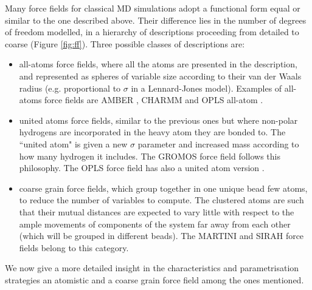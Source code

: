 \documentclass[graybox]{svmult}
\begin{document}
Many force fields for classical MD simulations adopt a functional form equal or similar to the one described above. Their difference lies in the number of degrees of freedom modelled, in a hierarchy of descriptions proceeding from detailed to coarse  (Figure \ref{fig:ff}). Three possible classes of descriptions are:
\begin{itemize}
\item all-atoms force fields, where all the atoms are presented in the description, and represented as spheres of variable size according to their van der Waals radius (e.g. proportional to $\sigma$ in a Lennard-Jones model). Examples of all-atoms force fields are AMBER \cite{Maier2015,Dickson2014,Wang2004_amber}, CHARMM \cite{MacKerell1998,Klauda2010,Huang2013} and OPLS all-atom \cite{Jorgensen1988}.
\item united atoms force fields, similar to the previous ones but where non-polar hydrogens are incorporated in the heavy atom they are bonded to. The ``united atom" is given a new $\sigma$ parameter and increased mass according to how many hydrogen it includes. The GROMOS force field \cite{Oostenbrink2004,Schmid2011} follows this philosophy. The OPLS force field has also a united atom version \cite{Jorgensen1996}.
\item coarse grain force fields, which group together in one unique bead few atoms, to reduce the number of variables to compute. The clustered atoms are such that their mutual distances are expected to vary little with respect to the ample movements of components of the system far away from each other (which will be grouped in different beads). The MARTINI \cite{Marrink2007,Monticelli2008,DeJong2013} and SIRAH \cite{Machado2018,Barrera2019} force fields belong to this category.
\end{itemize}
%
We now give a more detailed insight in the characteristics and parametrisation strategies an atomistic and a coarse grain force field among the ones mentioned.
\end{document}
